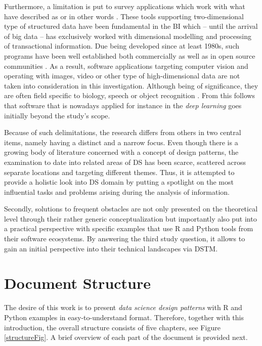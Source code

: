 Furthermore, a limitation is put to survey applications which work with what \textcite[2]{ShusenLiu2017} have described as  or in other words  \parencite[3]{Mikut2011}. 
These tools supporting two-dimensional type of structured data have been fundamental in the \ac{BI} which -- until the arrival of big data -- has exclusively worked with dimensional modelling and processing of transactional information.
Due being developed since at least 1980s, such programs have been well established both commercially as well as in open source communities \parencite{GoebelMichGru1999}.
As a result, software applications targeting computer vision and operating with images, video or other type of high-dimensional data are not taken into consideration in this investigation.
Although being of significance, they are often field specific to biology, speech or object recognition \parencite{Mikut2011}.
From this follows that software that is nowadays applied for instance in the \emph{deep learning} goes initially beyond the study's scope.

Because of such delimitations, the research differs from others in two central items, namely having a distinct and a narrow focus. 
Even though there is a growing body of literature concerned with a concept of design patterns, the examination to date into related areas of \ac{DS} has been scarce, scattered across separate locations and targeting different themes. 
Thus, it is attempted to provide a holistic look into \ac{DS} domain by putting a spotlight on the most influential tasks and problems arising during the analysis of information.

Secondly, solutions to frequent obstacles are not only presented on the theoretical level through their rather generic conceptualization but importantly also put into a practical perspective with specific examples that use R and Python tools from their software ecosystems.
By answering the third study question, it allows to gain an initial perspective into their technical landscapes via \acl{DSTM}.

\section{Document Structure}
The desire of this work is to present \emph{data science design patterns} with R and Python examples in easy-to-understand format.
Therefore, together with this introduction, the overall structure consists of five chapters, see Figure \ref{structureFig}.
A brief overview of each part of the document is provided next.

